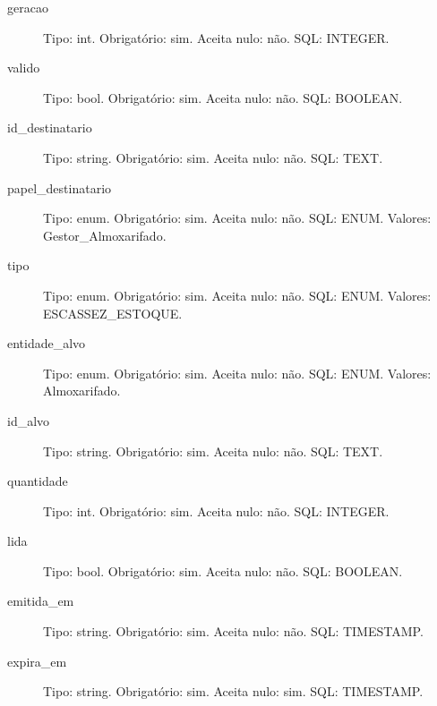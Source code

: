 \begin{description}
\item[geracao] Tipo: int. Obrigatório: sim. Aceita nulo: não.
SQL: INTEGER.
\item[valido] Tipo: bool. Obrigatório: sim. Aceita nulo: não.
SQL: BOOLEAN.
\item[id\_destinatario] Tipo: string. Obrigatório: sim. Aceita nulo: não.
SQL: TEXT.
\item[papel\_destinatario] Tipo: enum. Obrigatório: sim. Aceita nulo: não.
SQL: ENUM.
Valores: Gestor\_Almoxarifado.
\item[tipo] Tipo: enum. Obrigatório: sim. Aceita nulo: não.
SQL: ENUM.
Valores: ESCASSEZ\_ESTOQUE.
\item[entidade\_alvo] Tipo: enum. Obrigatório: sim. Aceita nulo: não.
SQL: ENUM.
Valores: Almoxarifado.
\item[id\_alvo] Tipo: string. Obrigatório: sim. Aceita nulo: não.
SQL: TEXT.
\item[quantidade] Tipo: int. Obrigatório: sim. Aceita nulo: não.
SQL: INTEGER.
\item[lida] Tipo: bool. Obrigatório: sim. Aceita nulo: não.
SQL: BOOLEAN.
\item[emitida\_em] Tipo: string. Obrigatório: sim. Aceita nulo: não.
SQL: TIMESTAMP.
\item[expira\_em] Tipo: string. Obrigatório: sim. Aceita nulo: sim.
SQL: TIMESTAMP.
\end{description}
